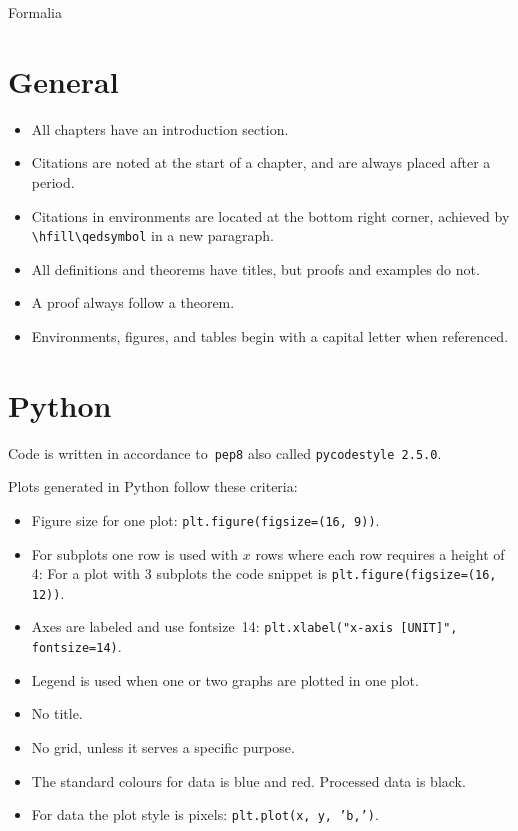\begin{center}
{\HUGE Formalia}
\end{center}
\section{General}
\begin{itemize}
    \item All chapters have an introduction section.
    \item Citations are noted at the start of a chapter, and are always placed after a period.
    \item Citations in environments are located at the bottom right corner, achieved by \texttt{\backslash hfill\backslash qedsymbol} in a new paragraph.
    \item All definitions and theorems have titles, but proofs and examples do not.
    \item A proof always follow a theorem.
    \item Environments, figures, and tables begin with a capital letter when referenced.
\end{itemize}

\section{Python}
Code is written in accordance to~\texttt{pep8} also called \texttt{pycodestyle 2.5.0}.

Plots generated in Python follow these criteria:
\begin{itemize}
    \item Figure size for one plot: \hfill\texttt{plt.figure(figsize=(16, 9))}.
    \item For subplots one row is used with \(x\) rows where each row requires a height of 4: For a plot with 3 subplots the code snippet is \hfill\texttt{plt.figure(figsize=(16, 12))}.
    \item Axes are labeled and use fontsize~14: \hfill\texttt{plt.xlabel("x-axis [UNIT]", fontsize=14)}.
    \item Legend is used when one or two graphs are plotted in one plot.
    \item No title.
    \item No grid, unless it serves a specific purpose.
    \item The standard colours for data is blue and red. Processed data is black.
    \item For data the plot style is pixels: \hfill\texttt{plt.plot(x, y, 'b,')}.
\end{itemize}
